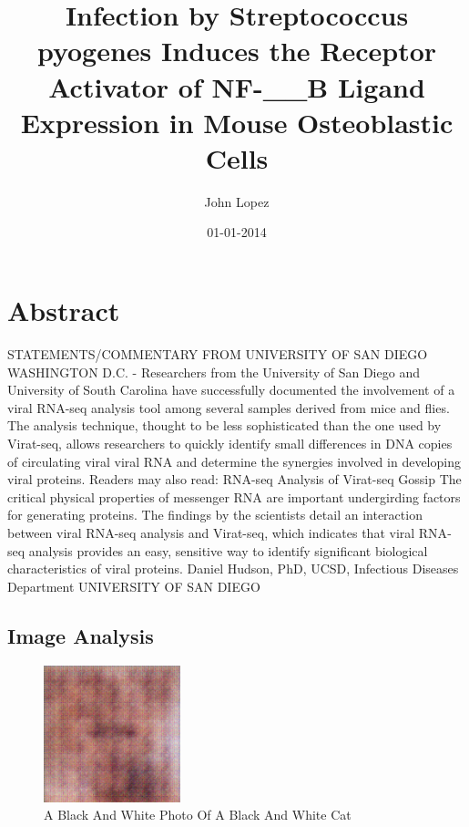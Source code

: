 \documentclass{article}%
\title{Infection by Streptococcus pyogenes Induces the Receptor Activator of NF{-}\_\_B Ligand Expression in Mouse Osteoblastic Cells}%
\author{John Lopez}%
\affil{Institute of Medicine, Chung Shan Medical University, No. 110, Section 1, Jianguo N. Road, Taichung 402, Taiwan}%
\date{01{-}01{-}2014}%
\begin{document}
%
\normalsize%
\maketitle%
\section{Abstract}%
\label{sec:Abstract}%
STATEMENTS/COMMENTARY FROM UNIVERSITY OF SAN DIEGO\newline%
WASHINGTON D.C. {-} Researchers from the University of San Diego and University of South Carolina have successfully documented the involvement of a viral RNA{-}seq analysis tool among several samples derived from mice and flies.\newline%
The analysis technique, thought to be less sophisticated than the one used by Virat{-}seq, allows researchers to quickly identify small differences in DNA copies of circulating viral viral RNA and determine the synergies involved in developing viral proteins.\newline%
Readers may also read:\newline%
RNA{-}seq Analysis of Virat{-}seq Gossip\newline%
The critical physical properties of messenger RNA are important undergirding factors for generating proteins. The findings by the scientists detail an interaction between viral RNA{-}seq analysis and Virat{-}seq, which indicates that viral RNA{-}seq analysis provides an easy, sensitive way to identify significant biological characteristics of viral proteins.\newline%
Daniel Hudson, PhD, UCSD, Infectious Diseases Department\newline%
UNIVERSITY OF SAN DIEGO

%
\subsection{Image Analysis}%
\label{subsec:ImageAnalysis}%


\begin{figure}[h!]%
\centering%
\includegraphics[width=150px]{500_fake_images/samples_5_33.png}%
\caption{A Black And White Photo Of A Black And White Cat}%
\end{figure}

%
\end{document}
